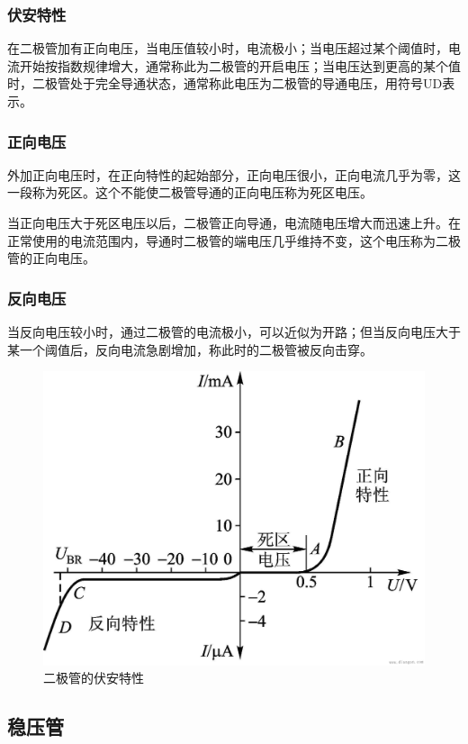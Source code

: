 \documentclass{ctexart}
\begin{document}
\subsubsection{伏安特性}
在二极管加有正向电压，当电压值较小时，电流极小；当电压超过某个阈值时，电流开始按指数规律增大，通常称此为二极管的开启电压；当电压达到更高的某个值时，二极管处于完全导通状态，通常称此电压为二极管的导通电压，用符号UD表示。
\subsubsection{正向电压}
外加正向电压时，在正向特性的起始部分，正向电压很小，正向电流几乎为零，这一段称为死区。这个不能使二极管导通的正向电压称为死区电压。 

当正向电压大于死区电压以后，二极管正向导通，电流随电压增大而迅速上升。在正常使用的电流范围内，导通时二极管的端电压几乎维持不变，这个电压称为二极管的正向电压。
\subsubsection{反向电压}
当反向电压较小时，通过二极管的电流极小，可以近似为开路；但当反向电压大于某一个阈值后，反向电流急剧增加，称此时的二极管被反向击穿。
\begin{figure}[!ht]\label{二极管的伏安特性}
    \centering
    \includegraphics[scale=0.15]{./pictures/二极管伏安特性.jpg}
    \caption{二极管的伏安特性}
    
\end{figure}
\subsection{稳压管}
\end{document}
